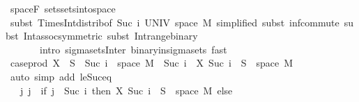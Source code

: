 \begin{isabellebody}
\ space{\isacharunderscore}{\kern0pt}F\ sets{\isachardot}{\kern0pt}sets{\isacharunderscore}{\kern0pt}into{\isacharunderscore}{\kern0pt}space\isanewline
\ \ \ \ \isamarkupfalse%
\ {\isacharparenleft}{\kern0pt}subst\ Times{\isacharunderscore}{\kern0pt}Int{\isacharunderscore}{\kern0pt}distrib{}{\isacharbrackleft}{\kern0pt}of\ {\isachardoublequoteopen}{\isacharbraceleft}{\kern0pt}Suc\ i{\isacharbraceright}{\kern0pt}{\isachardoublequoteclose}\ UNIV\ {\isachardoublequoteopen}space\ M{\isachardoublequoteclose}{\isacharcomma}{\kern0pt}\ simplified{\isacharbrackright}{\kern0pt}{\isacharcomma}{\kern0pt}\ subst\ inf{\isachardot}{\kern0pt}commute{\isacharcomma}{\kern0pt}\ subst\ Int{\isacharunderscore}{\kern0pt}assoc{\isacharbrackleft}{\kern0pt}symmetric{\isacharbrackright}{\kern0pt}{\isacharcomma}{\kern0pt}\ subst\ Int{\isacharunderscore}{\kern0pt}range{\isacharunderscore}{\kern0pt}binary{\isacharparenright}{\kern0pt}\ \isanewline
\ \ \ \ \ \ \ {\isacharparenleft}{\kern0pt}intro\ sigma{\isacharunderscore}{\kern0pt}sets{\isacharunderscore}{\kern0pt}Inter\ binary{\isacharunderscore}{\kern0pt}in{\isacharunderscore}{\kern0pt}sigma{\isacharunderscore}{\kern0pt}sets{\isacharcomma}{\kern0pt}\ fast{\isacharparenright}{\kern0pt}{\isacharplus}{\kern0pt}\isanewline
\ \ \isamarkupfalse%
\ \isamarkupfalse%
\ {\isachardoublequoteopen}case{\isacharunderscore}{\kern0pt}prod\ X\ {\isacharminus}{\kern0pt}{\isacharbackquote}{\kern0pt}\ S\ {\isasyminter}\ {\isacharparenleft}{\kern0pt}{\isacharbraceleft}{\kern0pt}Suc\ i{\isacharbraceright}{\kern0pt}\ {\isasymtimes}\ space\ M{\isacharparenright}{\kern0pt}\ {\isacharequal}{\kern0pt}\ {\isacharbraceleft}{\kern0pt}Suc\ i{\isacharbraceright}{\kern0pt}\ {\isasymtimes}\ {\isacharparenleft}{\kern0pt}X\ {\isacharparenleft}{\kern0pt}Suc\ i{\isacharparenright}{\kern0pt}\ {\isacharminus}{\kern0pt}{\isacharbackquote}{\kern0pt}\ S\ {\isasyminter}\ space\ M{\isacharparenright}{\kern0pt}{\isachardoublequoteclose}\ \isamarkupfalse%
\ {\isacharparenleft}{\kern0pt}auto\ simp\ add{\isacharcolon}{\kern0pt}\ le{\isacharunderscore}{\kern0pt}Suc{\isacharunderscore}{\kern0pt}eq{\isacharparenright}{\kern0pt}\isanewline
\ \ \isamarkupfalse%
\ \isamarkupfalse%
\ {\isachardoublequoteopen}{\isachardot}{\kern0pt}{\isachardot}{\kern0pt}{\isachardot}{\kern0pt}\ {\isacharequal}{\kern0pt}\ {\isacharparenleft}{\kern0pt}{\isasymUnion}j{\isachardot}{\kern0pt}\ {\isacharbraceleft}{\kern0pt}j{\isacharbraceright}{\kern0pt}\ {\isasymtimes}\ {\isacharparenleft}{\kern0pt}if\ j\ {\isacharequal}{\kern0pt}\ Suc\ i\ then\ {\isacharparenleft}{\kern0pt}X\ {\isacharparenleft}{\kern0pt}Suc\ i{\isacharparenright}{\kern0pt}\ {\isacharminus}{\kern0pt}{\isacharbackquote}{\kern0pt}\ S\ {\isasyminter}\ space\ M{\isacharparenright}{\kern0pt}\ else\ {\isacharbraceleft}{\kern0pt}{\isacharbraceright}{\kern0pt}{\isacharparenright}{\kern0pt}{\isacharparenright}{\kern0pt}{\isachardoublequoteclose}\ \isamarkupfalse%

\end{isabellebody}
